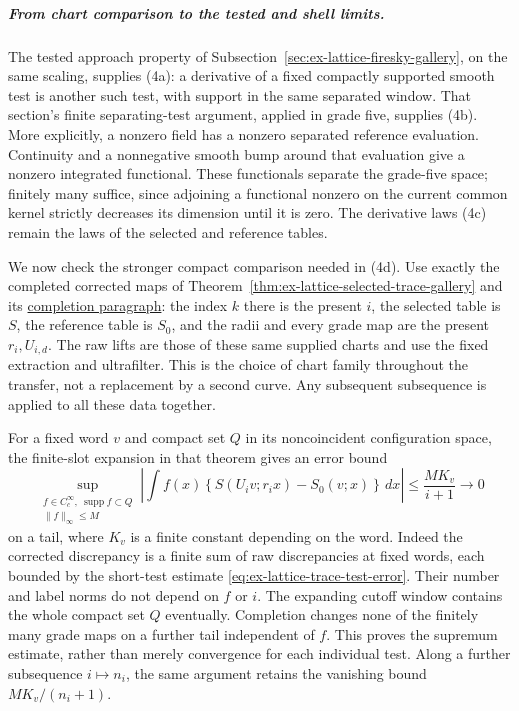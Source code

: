 \subparagraph{From chart comparison to the tested and shell limits.}
The tested approach property of
Subsection~\ref{sec:ex-lattice-firesky-gallery}, on the same scaling,
supplies (4a): a derivative of a fixed compactly supported smooth test
is another such test, with support in the same separated window.
That section's finite separating-test argument, applied in grade five,
supplies (4b). More explicitly, a nonzero field has a nonzero separated
reference evaluation. Continuity and a nonnegative smooth bump around
that evaluation give a nonzero integrated functional. These functionals
separate the grade-five space; finitely many suffice, since adjoining
a functional nonzero on the current common kernel strictly decreases
its dimension until it is zero. The derivative laws (4c) remain the
laws of the selected and reference tables.

We now check the stronger compact comparison needed in (4d). Use exactly
the completed corrected maps of
Theorem~\ref{thm:ex-lattice-selected-trace-gallery} and its
\hyperref[par:ex-trace-completed-uniform-tests]{completion paragraph}:
the index $k$ there is the present $i$, the selected table is $S$, the
reference table is $S_0$, and the radii and every grade map are the
present $r_i,U_{i,d}$. The raw lifts are those of these same supplied
charts and use the fixed extraction and ultrafilter. This is the
choice of chart family throughout the transfer, not a replacement by
a second curve. Any subsequent subsequence is applied to all these
data together.

For a fixed word $v$ and compact set $Q$ in its noncoincident
configuration space, the finite-slot expansion in that theorem gives
an error bound
\begin{equation}\label{eq:scribe-uniform-short-tests}
 \sup_{\substack{f\in C_c^\infty,\ \operatorname{supp}f\subset Q\\
                    \|f\|_\infty\le M}}
 \left|\int f(x)\left\{S(U_iv;r_ix)-S_0(v;x)\right\}\,dx\right|
       \le \frac{M K_v}{i+1}\longrightarrow0
\end{equation}
on a tail, where $K_v$ is a finite constant depending on the word.
Indeed the corrected discrepancy is a finite sum of raw discrepancies
at fixed words, each bounded by the short-test estimate
\eqref{eq:ex-lattice-trace-test-error}. Their number and label norms
do not depend on $f$ or $i$. The expanding cutoff window contains the
whole compact set $Q$ eventually. Completion changes none of the
finitely many grade maps on a further tail independent of $f$.
This proves the supremum estimate, rather than merely convergence for
each individual test. Along a further subsequence $i\mapsto n_i$,
the same argument retains the vanishing bound $MK_v/(n_i+1)$.


